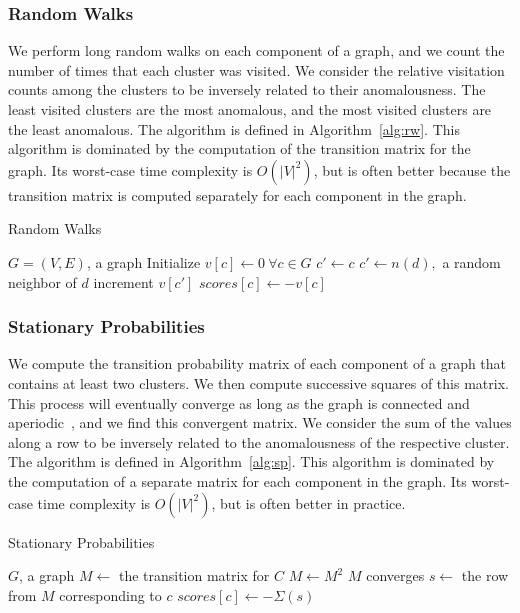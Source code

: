 \subsubsection{Random Walks}
We perform long random walks on each component of a graph, and we count the number of times that each cluster was visited.
We consider the relative visitation counts among the clusters to be inversely related to their anomalousness.
The least visited clusters are the most anomalous, and the most visited clusters are the least anomalous.
The algorithm is defined in Algorithm~\ref{alg:rw}.
This algorithm is dominated by the computation of the transition matrix for the graph.
Its worst-case time complexity is $O(|V|^2)$, but is often better because the transition matrix is computed separately for each component in the graph.

\begin{algorithm}[h]
    \caption{Random Walks}
    \label{alg:rw}
\begin{algorithmic}[1]
    \REQUIRE $G = (V,E)$, a graph
    \STATE Initialize $v[c] \gets 0 \ \forall c \in G$
        \STATE $c' \gets c$
            \STATE $c' \gets n(d),$ a random neighbor of $d$
            \STATE increment $v[c']$
        \ENDFOR
    \ENDFOR
        \STATE $scores[c] \gets -v[c]$
    \ENDFOR
\end{algorithmic}
\end{algorithm}

\subsubsection{Stationary Probabilities}
We compute the transition probability matrix of each component of a graph that contains at least two clusters.
We then compute successive squares of this matrix.
This process will eventually converge as long as the graph is connected and aperiodic~\cite{levin2017markov}, and we find this convergent matrix.
We consider the sum of the values along a row to be inversely related to the anomalousness of the respective cluster.
The algorithm is defined in Algorithm~\ref{alg:sp}.
This algorithm is dominated by the computation of a separate matrix for each component in the graph.
Its worst-case time complexity is $O(|V|^2)$, but is often better in practice.

\begin{algorithm}[h]
    \caption{Stationary Probabilities}
    \label{alg:sp}
\begin{algorithmic}[1]
    \REQUIRE $G$, a graph
        \STATE $M \gets$ the transition matrix for $C$
        \REPEAT
            \STATE $M \gets M^2$
        \UNTIL $M$ converges
            \STATE $s \gets $ the row from $M$ corresponding to $c$
            \STATE $scores[c] \gets -\Sigma(s)$ 
        \ENDFOR
    \ENDFOR
\end{algorithmic}
\end{algorithm}


